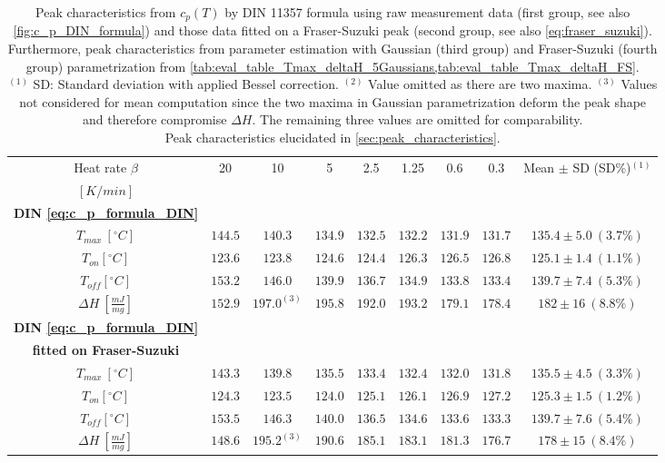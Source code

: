 \documentclass{scrartcl}[12pt, halfparskip]
\numberwithin{equation}{section}
\numberwithin{figure}{section}
\numberwithin{table}{section}
\begin{document}
\begin{table}[H]
	\caption{Peak characteristics from $c_p(T)$ by DIN 11357 formula using raw measurement data (first group, see also \cref{fig:c_p_DIN_formula}) and those data fitted on a Fraser-Suzuki peak (second group, see also \cref{eq:fraser_suzuki}). Furthermore, peak characteristics from parameter estimation with Gaussian (third group) and Fraser-Suzuki (fourth group) parametrization from \cref{tab:eval_table_Tmax_deltaH_5Gaussians,tab:eval_table_Tmax_deltaH_FS}. \\
	$^{(1)}$ SD: Standard deviation with applied Bessel correction. $^{(2)}$ Value omitted as there are two maxima. 
	$^{(3)}$ Values not considered for mean computation since the two maxima in Gaussian parametrization deform the peak shape and therefore compromise $\Delta H$. The remaining three values are omitted for comparability. \\
	Peak characteristics elucidated in \cref{sec:peak_characteristics}.}
	\hspace{-1.7cm}
	\begin{tabular}{| c | c | c | c | c | c | c | c || c |} \hline
		Heat rate $\beta$ & 20 & 10 & 5 & 2.5 & 1.25 & 0.6 & 0.3 & Mean $\pm$ SD (SD\%)$^{(1)}$ \\
		$[K/min]$ & & & & & & & & \\ \hline
		\textbf{DIN \cref{eq:c_p_formula_DIN}} & & & & & & & & \\[0.7ex]
		$T_{max} \ [^{\circ}C]$ & $144.5$ & $140.3$ & $134.9$ & $132.5$ & $132.2$ & $131.9$ & $131.7$ & $135.4 \pm 5.0 \ (3.7\%)$ \\[0.7ex]
		$T_{on} [^{\circ} C]$ & $123.6$ & $123.8$ & $124.6$ & $124.4$ & $126.3$ & $126.5$ & $126.8$ & $125.1 \pm 1.4 \ (1.1\%)$ \\[0.7ex]
		$T_{off} [^{\circ} C]$ & $153.2$ & $146.0$ & $139.9$ & $136.7$ & $134.9$ & $133.8$ & $133.4$ & $139.7 \pm 7.4 \ (5.3\%)$ \\[0.7ex]
		$\Delta H \ [\frac{mJ}{mg}]$ & $152.9$ & $197.0^{(3)}$ & $195.8$ & $192.0$ & $193.2$ & $179.1$ & $178.4$ & $182 \pm 16 \ (8.8\%)$ \\ \hline

		\textbf{DIN \cref{eq:c_p_formula_DIN}} & & & & & & & & \\
		\textbf{fitted on Fraser-Suzuki} & & & & & & & & \\
		$T_{max} \ [^{\circ}C]$ & $143.3$ & $139.8$ & $135.5$ & $133.4$ & $132.4$ & $132.0$ & $131.8$ & $135.5 \pm 4.5 \ (3.3\%)$ \\[0.7ex]
		$T_{on} [^{\circ} C]$ & $124.3$ & $123.5$ & $124.0$ & $125.1$ & $126.1$ & $126.9$ & $127.2$ & $125.3 \pm 1.5 \ (1.2\%)$ \\[0.7ex]
		$T_{off} [^{\circ} C]$ & $153.5$ & $146.3$ & $140.0$ & $136.5$ & $134.6$ & $133.6$ & $133.3$ & $139.7 \pm 7.6 \ (5.4\%)$ \\[0.7ex]
		$\Delta H \ [\frac{mJ}{mg}]$ & $148.6$ & $195.2^{(3)}$ & $190.6$ & $185.1$ & $183.1$ & $181.3$ & $176.7$ & $178 \pm 15 \ (8.4\%)$ \\ \hline
		

\end{tabular}
\end{table}
\end{document}
